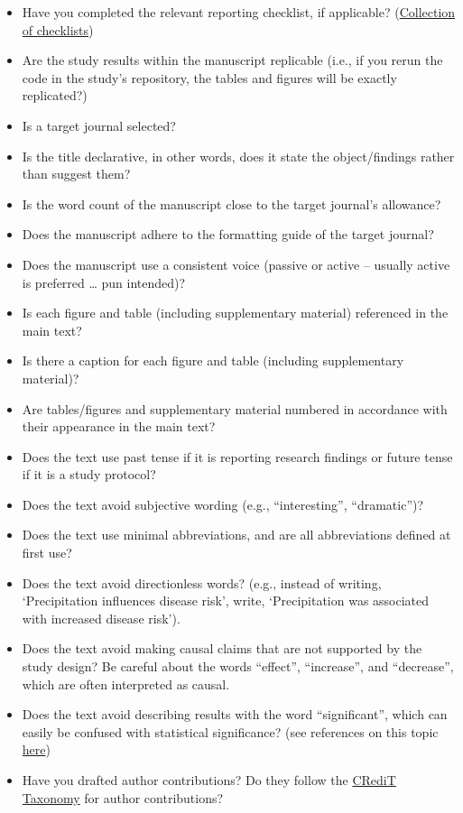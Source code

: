 \documentclass[
]{book}
\providecommand{\tightlist}{%
  \setlength{\itemsep}{0pt}\setlength{\parskip}{0pt}}
\begin{document}
\begin{itemize}
\tightlist
\item
  Have you completed the relevant reporting checklist, if applicable? (\href{https://www.equator-network.org/about-us/what-is-a-reporting-guideline/}{Collection of checklists})
\item
  Are the study results within the manuscript replicable (i.e., if you rerun the code in the study's repository, the tables and figures will be exactly replicated?)
\item
  Is a target journal selected?
\item
  Is the title declarative, in other words, does it state the object/findings rather than suggest them?
\item
  Is the word count of the manuscript close to the target journal's allowance?
\item
  Does the manuscript adhere to the formatting guide of the target journal?
\item
  Does the manuscript use a consistent voice (passive or active -- usually active is preferred \ldots{} pun intended)?
\item
  Is each figure and table (including supplementary material) referenced in the main text?
\item
  Is there a caption for each figure and table (including supplementary material)?
\item
  Are tables/figures and supplementary material numbered in accordance with their appearance in the main text?
\item
  Does the text use past tense if it is reporting research findings or future tense if it is a study protocol?
\item
  Does the text avoid subjective wording (e.g., ``interesting'', ``dramatic'')?
\item
  Does the text use minimal abbreviations, and are all abbreviations defined at first use?
\item
  Does the text avoid directionless words? (e.g., instead of writing, `Precipitation influences disease risk', write, `Precipitation was associated with increased disease risk').
\item
  Does the text avoid making causal claims that are not supported by the study design? Be careful about the words ``effect'', ``increase'', and ``decrease'', which are often interpreted as causal.
\item
  Does the text avoid describing results with the word ``significant'', which can easily be confused with statistical significance? (see references on this topic \href{https://journals.lww.com/epidem/Fulltext/2001/05000/The_Value_of_P.2.aspx}{here})
\item
  Have you drafted author contributions? Do they follow the \href{https://journals.plos.org/plosone/s/authorship/?utm_source=plos&utm_medium=blog&utm_campaign=plos-1607-credit\#loc-author-contributions}{CRediT Taxonomy} for author contributions?
\end{itemize}
\end{document}
